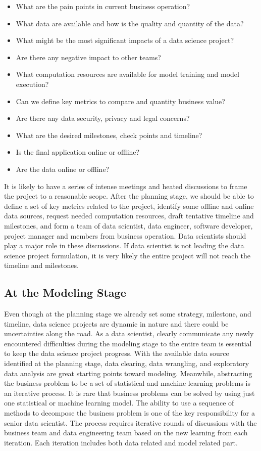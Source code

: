 \documentclass[12pt,]{krantz}
\providecommand{\tightlist}{%
  \setlength{\itemsep}{0pt}\setlength{\parskip}{0pt}}
\theoremstyle{definition}
\theoremstyle{definition}
\theoremstyle{definition}
\theoremstyle{remark}
\begin{document}
\begin{itemize}
\tightlist
\item
  What are the pain points in current business operation?
\item
  What data are available and how is the quality and quantity of the
  data?
\item
  What might be the most significant impacts of a data science project?
\item
  Are there any negative impact to other teams?
\item
  What computation resources are available for model training and model
  execution?
\item
  Can we define key metrics to compare and quantity business value?
\item
  Are there any data security, privacy and legal concerns?
\item
  What are the desired milestones, check points and timeline?
\item
  Is the final application online or offline?
\item
  Are the data online or offline?
\end{itemize}

It is likely to have a series of intense meetings and heated discussions
to frame the project to a reasonable scope. After the planning stage, we
should be able to define a set of key metrics related to the project,
identify some offline and online data sources, request needed
computation resources, draft tentative timeline and milestones, and form
a team of data scientist, data engineer, software developer, project
manager and members from business operation. Data scientists should play
a major role in these discussions. If data scientist is not leading the
data science project formulation, it is very likely the entire project
will not reach the timeline and milestones.

\subsection{At the Modeling Stage}\label{at-the-modeling-stage}

Even though at the planning stage we already set some strategy,
milestone, and timeline, data science projects are dynamic in nature and
there could be uncertainties along the road. As a data scientist,
clearly communicate any newly encountered difficulties during the
modeling stage to the entire team is essential to keep the data science
project progress. With the available data source identified at the
planning stage, data clearing, data wrangling, and exploratory data
analysis are great starting points toward modeling. Meanwhile,
abstracting the business problem to be a set of statistical and machine
learning problems is an iterative process. It is rare that business
problems can be solved by using just one statistical or machine learning
model. The ability to use a sequence of methods to decompose the
business problem is one of the key responsibility for a senior data
scientist. The process requires iterative rounds of discussions with the
business team and data engineering team based on the new learning from
each iteration. Each iteration includes both data related and model
related part.
\end{document}
